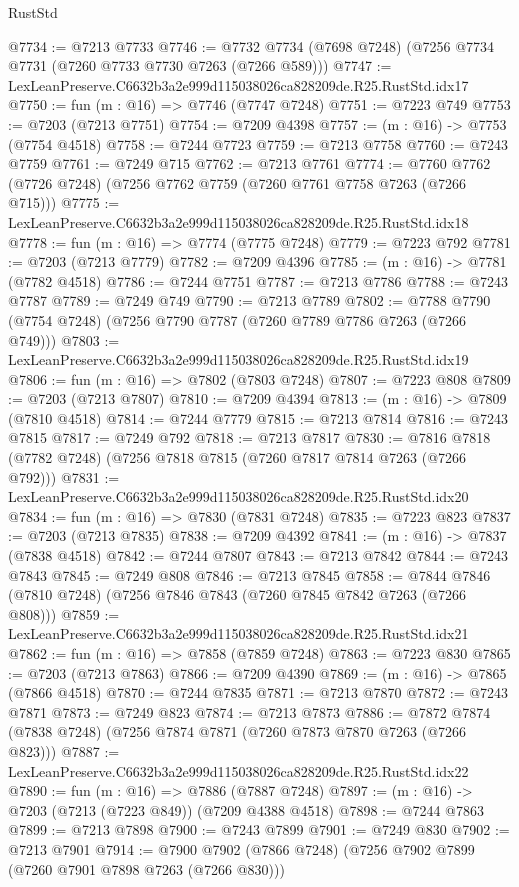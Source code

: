 \begin{lexlean}{RustStd}
\begin{coremodule}
@7734 := @7213 @7733
@7746 := @7732 @7734 (@7698 @7248) (@7256 @7734 @7731 (@7260 @7733 @7730 @7263 (@7266 @589)))
@7747 := LexLeanPreserve.C6632b3a2e999d115038026ca828209de.R25.RustStd.idx17
@7750 := fun (m : @16) => @7746 (@7747 @7248)
@7751 := @7223 @749
@7753 := @7203 (@7213 @7751)
@7754 := @7209 @4398
@7757 := (m : @16) -> @7753 (@7754 @4518)
@7758 := @7244 @7723
@7759 := @7213 @7758
@7760 := @7243 @7759
@7761 := @7249 @715
@7762 := @7213 @7761
@7774 := @7760 @7762 (@7726 @7248) (@7256 @7762 @7759 (@7260 @7761 @7758 @7263 (@7266 @715)))
@7775 := LexLeanPreserve.C6632b3a2e999d115038026ca828209de.R25.RustStd.idx18
@7778 := fun (m : @16) => @7774 (@7775 @7248)
@7779 := @7223 @792
@7781 := @7203 (@7213 @7779)
@7782 := @7209 @4396
@7785 := (m : @16) -> @7781 (@7782 @4518)
@7786 := @7244 @7751
@7787 := @7213 @7786
@7788 := @7243 @7787
@7789 := @7249 @749
@7790 := @7213 @7789
@7802 := @7788 @7790 (@7754 @7248) (@7256 @7790 @7787 (@7260 @7789 @7786 @7263 (@7266 @749)))
@7803 := LexLeanPreserve.C6632b3a2e999d115038026ca828209de.R25.RustStd.idx19
@7806 := fun (m : @16) => @7802 (@7803 @7248)
@7807 := @7223 @808
@7809 := @7203 (@7213 @7807)
@7810 := @7209 @4394
@7813 := (m : @16) -> @7809 (@7810 @4518)
@7814 := @7244 @7779
@7815 := @7213 @7814
@7816 := @7243 @7815
@7817 := @7249 @792
@7818 := @7213 @7817
@7830 := @7816 @7818 (@7782 @7248) (@7256 @7818 @7815 (@7260 @7817 @7814 @7263 (@7266 @792)))
@7831 := LexLeanPreserve.C6632b3a2e999d115038026ca828209de.R25.RustStd.idx20
@7834 := fun (m : @16) => @7830 (@7831 @7248)
@7835 := @7223 @823
@7837 := @7203 (@7213 @7835)
@7838 := @7209 @4392
@7841 := (m : @16) -> @7837 (@7838 @4518)
@7842 := @7244 @7807
@7843 := @7213 @7842
@7844 := @7243 @7843
@7845 := @7249 @808
@7846 := @7213 @7845
@7858 := @7844 @7846 (@7810 @7248) (@7256 @7846 @7843 (@7260 @7845 @7842 @7263 (@7266 @808)))
@7859 := LexLeanPreserve.C6632b3a2e999d115038026ca828209de.R25.RustStd.idx21
@7862 := fun (m : @16) => @7858 (@7859 @7248)
@7863 := @7223 @830
@7865 := @7203 (@7213 @7863)
@7866 := @7209 @4390
@7869 := (m : @16) -> @7865 (@7866 @4518)
@7870 := @7244 @7835
@7871 := @7213 @7870
@7872 := @7243 @7871
@7873 := @7249 @823
@7874 := @7213 @7873
@7886 := @7872 @7874 (@7838 @7248) (@7256 @7874 @7871 (@7260 @7873 @7870 @7263 (@7266 @823)))
@7887 := LexLeanPreserve.C6632b3a2e999d115038026ca828209de.R25.RustStd.idx22
@7890 := fun (m : @16) => @7886 (@7887 @7248)
@7897 := (m : @16) -> @7203 (@7213 (@7223 @849)) (@7209 @4388 @4518)
@7898 := @7244 @7863
@7899 := @7213 @7898
@7900 := @7243 @7899
@7901 := @7249 @830
@7902 := @7213 @7901
@7914 := @7900 @7902 (@7866 @7248) (@7256 @7902 @7899 (@7260 @7901 @7898 @7263 (@7266 @830)))

\end{coremodule}
\end{lexlean}
